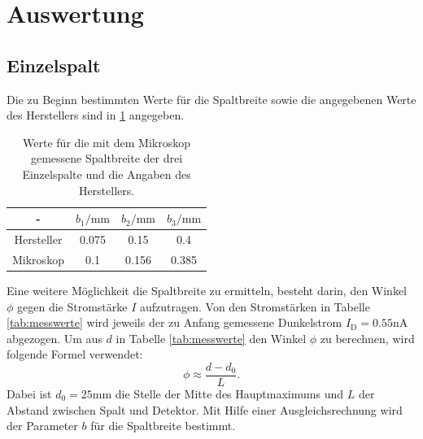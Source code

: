 \section{Auswertung}
\label{sec:Auswertung}

\subsection{Einzelspalt}
Die zu Beginn bestimmten Werte für die Spaltbreite sowie die angegebenen Werte des Herstellers sind in \ref{tab:b} angegeben.

\begin{table}
  \caption{Werte für die mit dem Mikroskop gemessene Spaltbreite der drei Einzelspalte und die Angaben des Herstellers.}
  \centering
  \label{tab:b}
  \begin{tabular}{c c c c}
    \toprule
   - & $b_1/\si{\milli\meter}$ & $b_2/\si{\milli\meter}$ & $b_3/\si{\milli\meter}$ \\
   \midrule
   Hersteller & 0.075 & 0.15 & 0.4 \\
   Mikroskop & 0.1 & 0.156 &  0.385\\
   \bottomrule
   \end{tabular}
\end{table}

Eine weitere Möglichkeit die Spaltbreite zu ermitteln, besteht darin, den Winkel $\phi$ gegen die Stromstärke $I$ aufzutragen. Von den Stromstärken in Tabelle \ref{tab:messwerte} wird jeweils der zu Anfang gemessene Dunkelstrom $I_\mathrm{D}=0.55\si{\nano\ampere}$ abgezogen. Um aus $d$ in Tabelle \ref{tab:messwerte} den Winkel $\phi$ zu berechnen, wird folgende Formel verwendet:
\begin{equation}
  \label{eqn:winkel}
  \phi \approx \frac{d-d_0}{L}.
\end{equation}
Dabei ist $d_0=25 \si{\milli\meter}$ die Stelle der Mitte des Hauptmaximums und $L$ der Abstand zwischen Spalt und Detektor.
Mit Hilfe einer Ausgleichsrechnung wird der Parameter $b$ für die Spaltbreite bestimmt.

